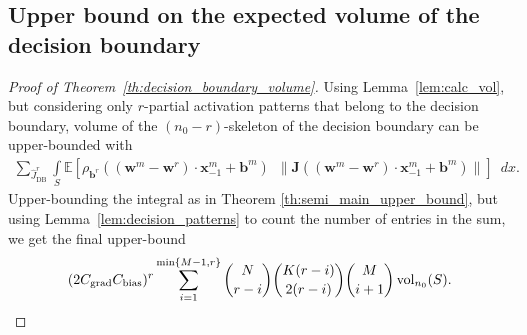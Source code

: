 \documentclass{article}
\theoremstyle{definition}
\newcommand{\cbias}{C_{\text{\normalfont bias}}}
\newcommand{\cgrad}{C_{\text{\normalfont grad}}}
\newcommand{\nin}{n_0}
\newcommand{\vol}{\operatorname{vol}}
\begin{document}
\subsection{Upper bound on the expected volume of the decision boundary}

\lemmaboundaryvolume*
\begin{proof}[Proof of Theorem~\ref{th:decision_boundary_volume}]
    Using Lemma~\ref{lem:calc_vol}, but considering only $r$-partial activation patterns that belong to the decision boundary, volume of the $(\nin-r)$-skeleton of the decision boundary can be upper-bounded with
    \begin{align*}
        \sum_{\hat{J}^r_{\text{DB}}} \int\limits_{S} \mathbb{E} \left[ \rho_{\mathbf{b}^r}((\mathbf{w}^m - \mathbf{w}^r) \cdot \mathbf{x}^m_{-1} + \mathbf{b}^m) \enspace \| \mathbf{J} ((\mathbf{w}^m - \mathbf{w}^r) \cdot \mathbf{x}^m_{-1} + \mathbf{b}^m)\| \right] \enspace d x.
    \end{align*}
    Upper-bounding the integral as in Theorem \ref{th:semi_main_upper_bound}, but using Lemma~\ref{lem:decision_patterns} to count the number of entries in the sum, we get the final upper-bound
    \begin{align*}
        (2 \cgrad \cbias)^r \sum_{i = 1} ^{\min\{M - 1, r\}} \binom{N}{r - i} \binom{K(r - i)}{2 (r - i)} \binom{M}{i + 1} \vol_{\nin}(S).
    \end{align*}
\end{proof}
\end{document}
